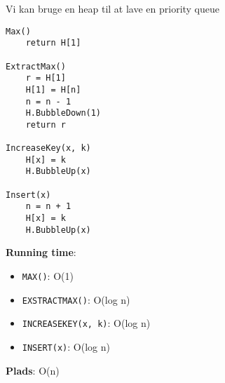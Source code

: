 Vi kan bruge en heap til at lave en priority queue\\
\begin{lstlisting}[frame=single, mathescape=true]
Max()
	return H[1]

ExtractMax()
	r = H[1]
	H[1] = H[n]
	n = n - 1
	H.BubbleDown(1)
	return r

IncreaseKey(x, k)
	H[x] = k
	H.BubbleUp(x)

Insert(x)
	n = n + 1
	H[x] = k
	H.BubbleUp(x)
\end{lstlisting}
\textbf{Running time}:
\begin{itemize}
	\item \texttt{MAX()}: O(1)
	\item \texttt{EXSTRACTMAX()}: O(log n)
	\item \texttt{INCREASEKEY(x, k)}: O(log n)
	\item \texttt{INSERT(x)}: O(log n)
\end{itemize}
\textbf{Plads}: O(n)